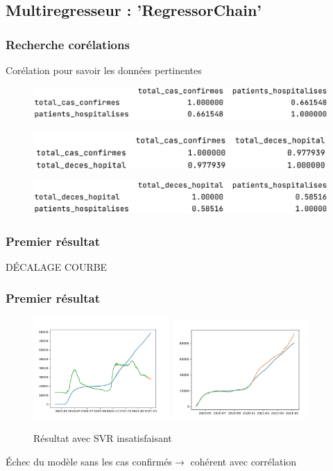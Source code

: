 \documentclass{beamer}
\begin{document}
\subsection{Multiregresseur : 'RegressorChain'}
\begin{frame}
	\frametitle{Recherche corélations}
	Corélation pour savoir les données pertinentes
	\begin{figure}
		\includegraphics[width=\textwidth]{cor2}
	\end{figure}
	\begin{figure}
		\includegraphics[width=\textwidth]{cor1}
	\end{figure}
	\begin{figure}
		\includegraphics[width=\textwidth]{cor4}
	\end{figure}
\end{frame}

\begin{frame}
	\frametitle{Premier résultat}
	DÉCALAGE COURBE
	\begin{figure}[h]
	\end{figure}
\end{frame}

\begin{frame}
	\frametitle{Premier résultat}
	
	\begin{figure}[h]
		\centering
		\includegraphics[width=0.4615\textwidth]{NN mlpregressor 140k iter (updated data)}
		\includegraphics[width=0.46\textwidth]{NN_1}
		\caption{Résultat avec SVR insatisfaisant}
	\end{figure}
	Échec du modèle sans les cas confirmés$\rightarrow$ cohérent avec corrélation
\end{frame}
\end{document}
